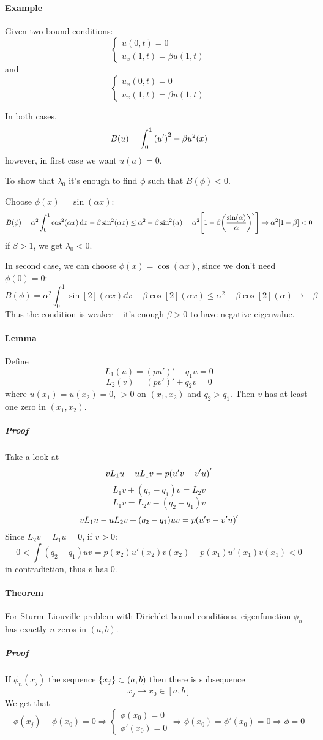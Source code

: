 \paragraph{Example}
Given two bound conditions:
$$\begin{cases}
u(0,t) = 0\\
u_x(1,t) = \beta u(1,t)
\end{cases}$$
and 
$$\begin{cases}
u_x(0,t) = 0\\
u_x(1,t) = \beta u(1,t)
\end{cases}$$

In both cases, 
$$B(u) = \int_0^1 \qty(u')^2 - \beta u^2(x)$$
however, in first case we want $u(a) = 0$.

To show that $\lambda_0$ it's enough to find $\phi$ such that $B(\phi)<0$.

Choose $\phi(x) = \sin(\alpha x)$:
$$B(\phi)  = \alpha^2 \int_0^1 \cos[2](\alpha x) \dd{x} - \beta \sin[2](\alpha x) \leq \alpha^2 - \beta\sin[2](\alpha ) = \alpha^2 \qty[1- \beta\qty(\frac{\sin(\alpha ) }{\alpha})^2] \to\alpha^2 \qty[1- \beta] < 0$$
if $\beta > 1$, we get $\lambda_0<0$.

In second case, we can choose $\phi(x) = \cos(\alpha x)$, since we don't need $\phi(0)=0$:
$$B(\phi)  = \alpha^2 \int_0^1 \sin[2](\alpha x) \dd{x} - \beta \cos[2](\alpha x) \leq \alpha^2 - \beta\cos[2](\alpha ) \to -\beta$$
Thus the condition is weaker -- it's enough $\beta>0$ to have negative eigenvalue.
\paragraph{Lemma}
Define
$$L_1(u) = (pu')' + q_1u = 0$$
$$L_2(v) = (pv')' + q_2v = 0$$
where
$u(x_1)=u(x_2) = 0$, $>0$ on $(x_1,x_2)$ and $q_2>q_1$. Then $v$ has at least one zero in $(x_1,x_2)$.
\subparagraph{Proof}
Take a look at
$$vL_1u - uL_1v = p\qty(u'v-v'u)'$$
$$L_1v + (q_2-q_1)v  = L_2v$$
$$L_1v   = L_2v -  (q_2-q_1)v$$
$$vL_1u - uL_2v + (q_2-q_1)uv = p\qty(u'v-v'u)'$$
Since $L_2 v = L_1 u = 0$, if $v>0$:
$$0<\int (q_2-q_1)uv = p(x_2)u'(x_2)v(x_2)-p(x_1)u'(x_1)v(x_1)<0$$
in contradiction, thus $v$ has $0$.

\paragraph{Theorem}
For Sturm–Liouville problem with Dirichlet bound conditions, eigenfunction $\phi_n$  has exactly $n$ zeros in $(a,b)$.
\subparagraph{Proof}
If $\phi_n(x_j)$ the sequence $\qty{x_j}\subset (a,b)$ then there is subsequence
$$x_j \to x_0 \in [a,b]$$
We get that
$$\phi(x_j) - \phi(x_0) = 0 \Rightarrow \begin{cases}
\phi(x_0) = 0\\\phi'(x_0)= 0 
\end{cases} \Rightarrow \phi(x_0) = \phi'(x_0) = 0 \Rightarrow \phi = 0$$


